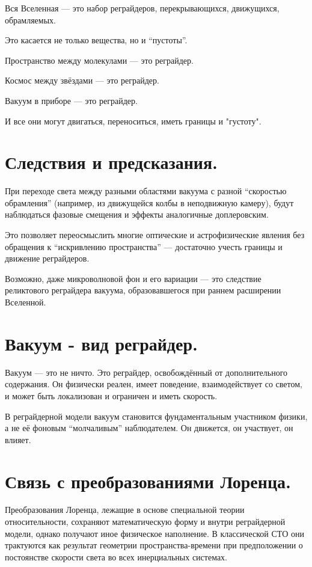 \documentclass[12pt]{article}
\begin{document}
Вся Вселенная — это набор реграйдеров, перекрывающихся, движущихся, обрамляемых.

Это касается не только вещества, но и “пустоты”.

Пространство между молекулами — это реграйдер.

Космос между звёздами — это реграйдер.

Вакуум в приборе — это реграйдер.

И все они могут двигаться, переноситься, иметь границы и "густоту".

\section*{Следствия и предсказания.}

При переходе света между разными областями вакуума с разной “скоростью обрамления” (например, из движущейся колбы в неподвижную камеру), будут наблюдаться фазовые смещения и эффекты аналогичные доплеровским.

Это позволяет переосмыслить многие оптические и астрофизические явления без обращения к “искривлению пространства” — достаточно учесть границы и движение реграйдеров.

Возможно, даже микроволновой фон и его вариации — это следствие реликтового реграйдера вакуума, образовавшегося при раннем расширении Вселенной.

\section*{Вакуум - вид реграйдер.}

Вакуум — это не ничто. Это реграйдер, освобождённый от дополнительного содержания. Он физически реален, имеет поведение, взаимодействует со светом, и может быть локализован и ограничен и иметь скорость.

В реграйдерной модели вакуум становится фундаментальным участником физики, а не её фоновым “молчаливым” наблюдателем. Он движется, он участвует, он влияет.

\section*{Связь с преобразованиями Лоренца.}

Преобразования Лоренца, лежащие в основе специальной теории относительности, сохраняют математическую форму и внутри реграйдерной модели, однако получают иное физическое наполнение. В классической СТО они трактуются как результат геометрии пространства-времени при предположении о постоянстве скорости света во всех инерциальных системах.
\end{document}
